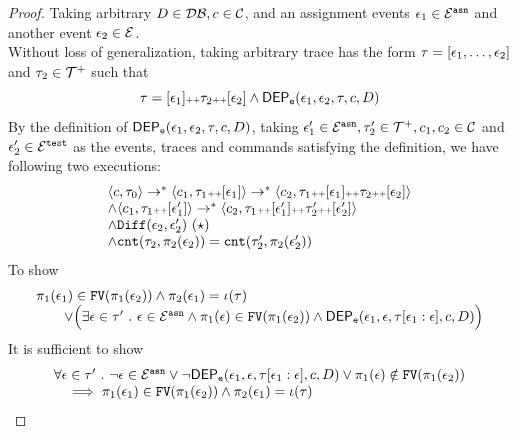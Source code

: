 \begin{proof}
Taking arbitrary $D \in \mathcal{DB} , c \in \mathcal{C}$, and an assignment events $\mathtt{\epsilon}_1 \in \mathcal{E}^{\mathtt{{asn}}}$ and another event 
$\mathtt{\epsilon}_2\in \mathcal{E}$.
\\
Without loss of generalization, 
taking arbitrary trace has the form $\mathtt{\tau} = [\mathtt{\epsilon}_1, \ldots, \mathtt{\epsilon}_2]$ 
 and $\mathtt{\tau}_2 \in \mathcal{T}^{+}$ such that
 \[
	\mathtt{\tau} = [\mathtt{\epsilon}_1] {\scriptscriptstyle ++} \mathtt{\tau}_2 {\scriptscriptstyle ++} [\mathtt{\epsilon}_2]
	\land
	\mathsf{DEP_{\mathtt{e}}}(\mathtt{\epsilon}_1, \mathtt{\epsilon}_2, \mathtt{\tau}, c, D)
	\]
By the definition of $\mathsf{DEP_{\mathtt{e}}}(\mathtt{\epsilon}_1, \mathtt{\epsilon}_2, \mathtt{\tau}, c, D)$, 
taking $ \mathtt{\epsilon}_1' \in \mathcal{E}^{\mathtt{{asn}}},
\mathtt{\tau}_2' \in \mathcal{T}^{+}, c_1, c_2 \in \mathcal{C}$ and $\mathtt{\epsilon}_2' \in \mathcal{E}^{\mathtt{{test}}}$
 as the events, traces and commands satisfying the definition,
 we have following two executions:
%
\[
\begin{array}{l}
\config{c, \trace_0} \rightarrow^{*}
\config{c_1, \trace_1 \tracecat [\event_1]} \rightarrow^{*} \config{c_2, \trace_1 \tracecat [\event_1] \tracecat \trace_2 \tracecat [\event_2]} 
\\ 
\land
\config{c_1, \trace_1 \tracecat [\event_1']} \rightarrow^{*} \config{c_2, \trace_1 \tracecat [\event_1'] \tracecat \trace_2' \tracecat [\event_2']} 
\\
\land \diff(\event_2,\event_2' ) ~(\star) 
\\
\land 
    \vcounter(\trace_2, \pi_2(\event_2))
    = 
    \vcounter(\trace_2', \pi_2(\event_2'))
\end{array}
\]
To show
\[
\begin{array}{l}
	\pi_1(\mathtt{\epsilon}_1) \in \mathtt{FV}(\pi_1(\mathtt{\epsilon}_2)) \land {\pi_2(\ensuremath{\mathtt{\epsilon}}_1)} = \iota(\mathtt{\tau})
	\\ \qquad 
	\lor
	\Big( 
		\exists \mathtt{\epsilon} \in \mathtt{\tau}' ~.~ 
	\mathtt{\epsilon} \in \mathcal{E}^{\mathtt{{asn}}}
	\land 
	\pi_1(\mathtt{\epsilon}) \in \mathtt{FV}(\pi_1(\mathtt{\epsilon}_2)) \land
	\mathsf{DEP_{\mathtt{e}}}(\mathtt{\epsilon}_1, \mathtt{\epsilon}, \mathtt{\tau}[\mathtt{\epsilon}_1:\mathtt{\epsilon}], c, D)
	\Big) 
\end{array}
\]
It is sufficient to show
\[
\begin{array}{l}
	\forall \mathtt{\epsilon} \in \mathtt{\tau}' ~.~ 
	\neg \mathtt{\epsilon} \in \mathcal{E}^{\mathtt{{asn}}}
	\lor 
	\neg \mathsf{DEP_{\mathtt{e}}}(\mathtt{\epsilon}_1, \mathtt{\epsilon}, \mathtt{\tau}[\mathtt{\epsilon}_1:\mathtt{\epsilon}], c, D)
	\lor
	\pi_1(\mathtt{\epsilon}) \notin \mathtt{FV}(\pi_1(\mathtt{\epsilon}_2)) 
	\\ \quad 
	\implies 
	\pi_1(\mathtt{\epsilon}_1) \in \mathtt{FV}(\pi_1(\mathtt{\epsilon}_2)) \land {\pi_2(\ensuremath{\mathtt{\epsilon}}_1)} = \iota(\mathtt{\tau})
\end{array}
\]


\end{proof}
